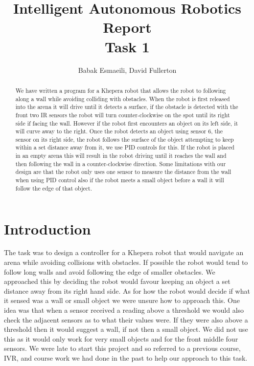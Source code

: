 \documentclass[]{article}
\begin{document}
\title{Intelligent Autonomous Robotics Report\\Task 1}
\author{Babak Esmaeili, David Fullerton}
\maketitle

\begin{abstract}
We have written a program for a Khepera robot that allows the robot to following along a wall while avoiding colliding with obstacles. When the robot is first released into the arena it will drive until it detects a surface, if the obstacle is detected with the front two IR sensors the robot will turn counter-clockwise on the spot until its right side if facing the wall. However if the robot first encounters an object on its left side, it will curve away to the right. Once the robot detects an object using sensor 6, the sensor on its right side, the robot follows the surface of the object attempting to keep within a set distance away from it, we use PID controls for this. If the robot is placed in an empty arena this will result in the robot driving until it reaches the wall and then following the wall in a counter-clockwise direction. Some limitations with our design are that the robot only uses one sensor to measure the distance from the wall when using PID control also if the robot meets a small object before a wall it will follow the edge of that object.
\end{abstract}


\section{Introduction}
The task was to design a controller for a Khepera robot that would navigate an arena while avoiding collisions with obstacles. If possible the robot would tend to follow long walls and avoid following the edge of smaller obstacles. We approached this by deciding the robot would favour keeping an object a set distance away from its right hand side. As for how the robot would decide if what it sensed was a wall or small object we were unsure how to approach this. One idea was that when a sensor received a reading above a threshold we would also check the adjacent sensors as to what their values were. If they were also above a threshold then it would suggest a wall, if not then a small object. We did not use this as it would only work for very small objects and for the front middle four sensors. We were late to start this project and so referred to a previous course, IVR, and course work we had done in the past to help our approach to this task.
\end{document}
